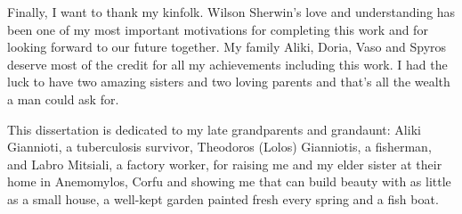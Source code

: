 Finally, I want to thank my kinfolk. Wilson Sherwin's love and understanding has been one of my
most important motivations for completing this work and for looking forward to our future together.
My family Aliki, Doria, Vaso and Spyros deserve most of the credit for all my achievements including
this work. I had the luck to have two amazing sisters and two loving parents and that's all the wealth 
a man could ask for. 

This dissertation is dedicated to my late grandparents and grandaunt: 
Aliki Giannioti, a tuberculosis survivor, Theodoros (Lolos) Gianniotis, a fisherman, and
Labro Mitsiali, a factory  worker, for raising me and my elder sister at their home in Anemomylos, Corfu and showing me that can build beauty with as little as
a small house, a well-kept garden painted fresh every spring and a fish 
boat.

